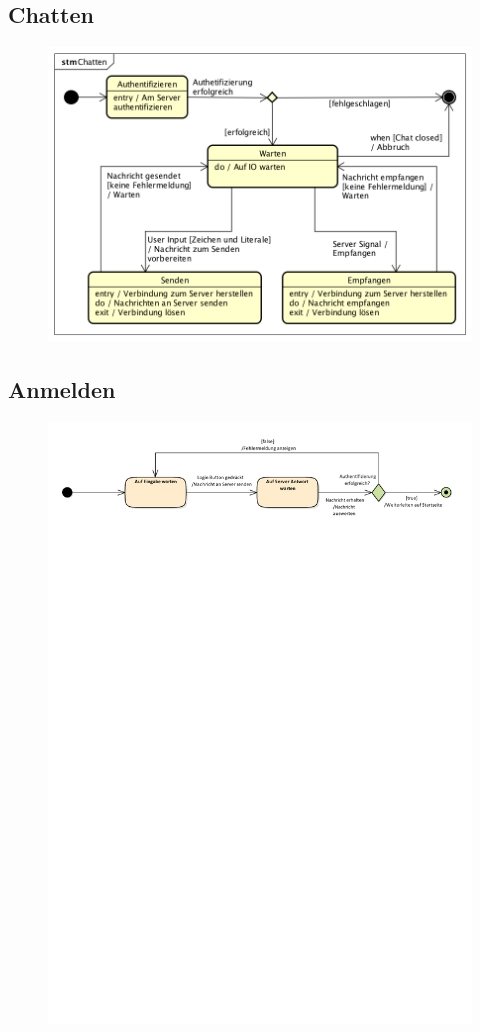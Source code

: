 \subsection*{Chatten}
\begin{figure}[h!]
	\centering
	\includegraphics[width = 0.8\linewidth]{docs/4_Zustandsdiagramme/Patrick/STM_Chatten.png}
	\label{fig:STM_Chatten}
\end{figure}

\subsection*{Anmelden}
\begin{figure}[h!]
	\centering
	\includegraphics[width = 0.8\linewidth]{docs/4_Zustandsdiagramme/Marius/Anmelden.pdf}
	\label{fig:STM_Anmelden}
\end{figure}